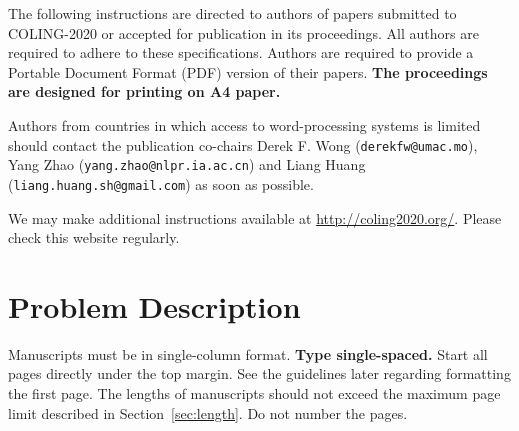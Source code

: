 \documentclass[11pt]{article}
\begin{document}
%
% 

The following instructions are directed to authors of papers submitted
to COLING-2020 or accepted for publication in its proceedings. All
authors are required to adhere to these specifications. Authors are
required to provide a Portable Document Format (PDF) version of their
papers. \textbf{The proceedings are designed for printing on A4
  paper.}

Authors from countries in which access to word-processing systems is
limited should contact the publication co-chairs
Derek F. Wong (\texttt{derekfw@umac.mo}), Yang Zhao (\texttt{yang.zhao@nlpr.ia.ac.cn}) and
Liang Huang (\texttt{liang.huang.sh@gmail.com})
as soon as possible.

We may make additional instructions available at \url{http://coling2020.org/}. Please check
this website regularly.


\section{Problem Description}

Manuscripts must be in single-column format. {\bf Type single-spaced.}  Start all
pages directly under the top margin. See the guidelines later
regarding formatting the first page. The lengths of manuscripts
should not exceed the maximum page limit described in Section~\ref{sec:length}.
Do not number the pages.
\end{document}
